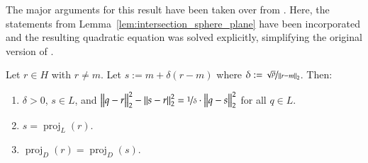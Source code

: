 \documentclass[twoside,11pt]{article}
\DeclareMathOperator{\proj}{proj}
\newcommand{\0}{\mathcal{O}}
\newcommand{\norm}[1]{\left\Vert#1\right\Vert}
\begin{document}
The major arguments for this result have been taken over from \cite{Theis2005}.
Here, the statements from Lemma~\ref{lem:intersection_sphere_plane} have been incorporated and the resulting quadratic equation was solved explicitly, simplifying the original version of \cite{Theis2005}.
\begin{lemma}
\label{lem:sphere}
Let $r\in H$ with $r\neq m$. Let $s := m + \delta(r - m)$ where $\delta := \nicefrac{\sqrt{\rho}}{\norm{r - m}_2}$.
Then:
\begin{enumerate}
\item \label{lem:sphere_a}
$\delta > 0$, $s\in L$, and $\norm{q - r}_2^2 - \norm{s - r}_2^2 = \nicefrac{1}{\delta}\cdot\norm{q - s}_2^2$ for all $q\in L$.

\item \label{lem:sphere_b}
$s = \proj_L(r)$.

\item \label{lem:sphere_c}
$\proj_D(r) = \proj_D(s)$.
\end{enumerate}
\end{lemma}
\end{document}
